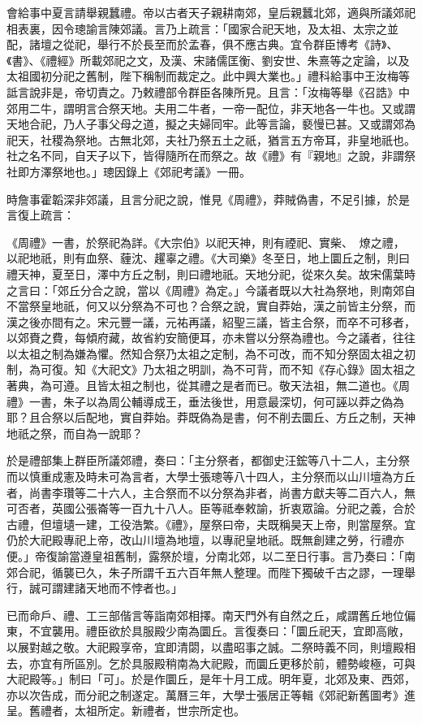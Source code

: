 會給事中夏言請舉親蠶禮。帝以古者天子親耕南郊，皇后親蠶北郊，適與所議郊祀相表裏，因令璁諭言陳郊議。言乃上疏言：「國家合祀天地，及太祖、太宗之並配，諸壇之從祀，舉行不於長至而於孟春，俱不應古典。宜令群臣博考《詩》、《書》、《禮經》所載郊祀之文，及漢、宋諸儒匡衡、劉安世、朱熹等之定論，以及太祖國初分祀之舊制，陛下稱制而裁定之。此中興大業也。」禮科給事中王汝梅等詆言說非是，帝切責之。乃敕禮部令群臣各陳所見。且言：「汝梅等舉《召誥》中郊用二牛，謂明言合祭天地。夫用二牛者，一帝一配位，非天地各一牛也。又或謂天地合祀，乃人子事父母之道，擬之夫婦同牢。此等言論，褻慢已甚。又或謂郊為祀天，社稷為祭地。古無北郊，夫社乃祭五土之祇，猶言五方帝耳，非皇地祇也。社之名不同，自天子以下，皆得隨所在而祭之。故《禮》有『親地』之說，非謂祭社即方澤祭地也。」璁因錄上《郊祀考議》一冊。

時詹事霍韜深非郊議，且言分祀之說，惟見《周禮》，莽賊偽書，不足引據，於是言復上疏言：

《周禮》一書，於祭祀為詳。《大宗伯》以祀天神，則有禋祀、實柴、燎之禮，以祀地祇，則有血祭、薶沈、趯辜之禮。《大司樂》冬至日，地上圜丘之制，則曰禮天神，夏至日，澤中方丘之制，則曰禮地祇。天地分祀，從來久矣。故宋儒葉時之言曰：「郊丘分合之說，當以《周禮》為定。」今議者既以大社為祭地，則南郊自不當祭皇地祇，何又以分祭為不可也？合祭之說，實自莽始，漢之前皆主分祭，而漢之後亦間有之。宋元豐一議，元祐再議，紹聖三議，皆主合祭，而卒不可移者，以郊賚之費，每傾府藏，故省約安簡便耳，亦未嘗以分祭為禮也。今之議者，往往以太祖之制為嫌為懼。然知合祭乃太祖之定制，為不可改，而不知分祭固太祖之初制，為可復。知《大祀文》乃太祖之明訓，為不可背，而不知《存心錄》固太祖之著典，為可遵。且皆太祖之制也，從其禮之是者而已。敬天法祖，無二道也。《周禮》一書，朱子以為周公輔導成王，垂法後世，用意最深切，何可誣以莽之偽為耶？且合祭以后配地，實自莽始。莽既偽為是書，何不削去圜丘、方丘之制，天神地祇之祭，而自為一說耶？

於是禮部集上群臣所議郊禮，奏曰：「主分祭者，都御史汪鋐等八十二人，主分祭而以慎重成憲及時未可為言者，大學士張璁等八十四人，主分祭而以山川壇為方丘者，尚書李瓚等二十六人，主合祭而不以分祭為非者，尚書方獻夫等二百六人，無可否者，英國公張崙等一百九十八人。臣等祗奉敕諭，折衷眾論。分祀之義，合於古禮，但壇壝一建，工役浩繁。《禮》，屋祭曰帝，夫既稱昊天上帝，則當屋祭。宜仍於大祀殿專祀上帝，改山川壇為地壇，以專祀皇地祇。既無創建之勞，行禮亦便。」帝復諭當遵皇祖舊制，露祭於壇，分南北郊，以二至日行事。言乃奏曰：「南郊合祀，循襲已久，朱子所謂千五六百年無人整理。而陛下獨破千古之謬，一理舉行，誠可謂建諸天地而不悖者也。」

已而命戶、禮、工三部偕言等詣南郊相擇。南天門外有自然之丘，咸謂舊丘地位偏東，不宜襲用。禮臣欲於具服殿少南為圜丘。言復奏曰：「圜丘祀天，宜即高敞，以展對越之敬。大祀殿享帝，宜即清閟，以盡昭事之誠。二祭時義不同，則壇殿相去，亦宜有所區別。乞於具服殿稍南為大祀殿，而圜丘更移於前，體勢峻極，可與大祀殿等。」制曰「可」。於是作圜丘，是年十月工成。明年夏，北郊及東、西郊，亦以次告成，而分祀之制遂定。萬曆三年，大學士張居正等輯《郊祀新舊圖考》進呈。舊禮者，太祖所定。新禮者，世宗所定也。

